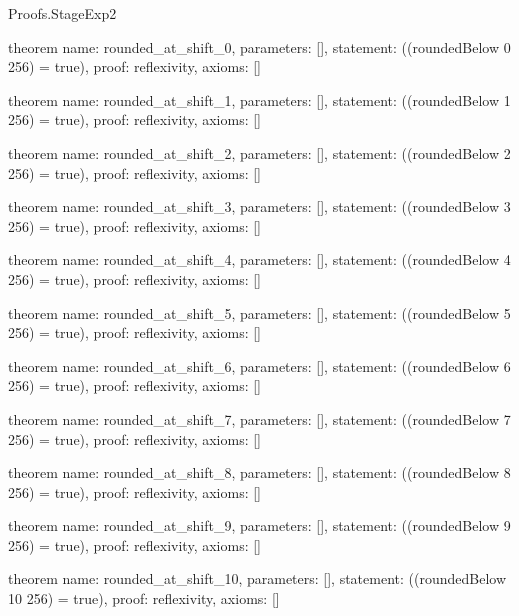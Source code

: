 \begin{lexlean}{Proofs.StageExp2}
\begin{semanticmodule}
theorem{
  name: rounded_at_shift_0,
  parameters: [],
  statement: ((roundedBelow 0 256) = true),
  proof: reflexivity{},
  axioms: []
}

theorem{
  name: rounded_at_shift_1,
  parameters: [],
  statement: ((roundedBelow 1 256) = true),
  proof: reflexivity{},
  axioms: []
}

theorem{
  name: rounded_at_shift_2,
  parameters: [],
  statement: ((roundedBelow 2 256) = true),
  proof: reflexivity{},
  axioms: []
}

theorem{
  name: rounded_at_shift_3,
  parameters: [],
  statement: ((roundedBelow 3 256) = true),
  proof: reflexivity{},
  axioms: []
}

theorem{
  name: rounded_at_shift_4,
  parameters: [],
  statement: ((roundedBelow 4 256) = true),
  proof: reflexivity{},
  axioms: []
}

theorem{
  name: rounded_at_shift_5,
  parameters: [],
  statement: ((roundedBelow 5 256) = true),
  proof: reflexivity{},
  axioms: []
}

theorem{
  name: rounded_at_shift_6,
  parameters: [],
  statement: ((roundedBelow 6 256) = true),
  proof: reflexivity{},
  axioms: []
}

theorem{
  name: rounded_at_shift_7,
  parameters: [],
  statement: ((roundedBelow 7 256) = true),
  proof: reflexivity{},
  axioms: []
}

theorem{
  name: rounded_at_shift_8,
  parameters: [],
  statement: ((roundedBelow 8 256) = true),
  proof: reflexivity{},
  axioms: []
}

theorem{
  name: rounded_at_shift_9,
  parameters: [],
  statement: ((roundedBelow 9 256) = true),
  proof: reflexivity{},
  axioms: []
}

theorem{
  name: rounded_at_shift_10,
  parameters: [],
  statement: ((roundedBelow 10 256) = true),
  proof: reflexivity{},
  axioms: []
}
\end{semanticmodule}
\end{lexlean}

